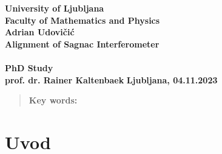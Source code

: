 \documentclass{article}
\begin{document}
\begin{titlepage}
	\begin{center}
		{\large \textbf{University of Ljubljana}} \\[0.1cm]
		{\large \textbf{Faculty of Mathematics and Physics}}
		\\[0.5cm]
		\vspace{2cm}
		{\LARGE \textbf{Adrian Udovičić}}\\[2.5cm]
		{\Huge \textbf{Alignment of Sagnac Interferometer}}\\[0.5cm]
		{\Huge \textbf{ }}\\[2cm]
		{\LARGE\textbf{PhD Study}}\\[2.5cm]
		\vspace{1.5cm}
		\hfill \large\textbf{prof. dr. Rainer Kaltenbaek}
		\vfill
		\large\textbf{{Ljubljana, 04.11.2023}}
	\end{center}
\end{titlepage}

\newpage
{}
\tableofcontents
\newpage
{}
\begin{abstract}
	\textbf{Key words:}
\end{abstract}
\newpage
{}
\section{Uvod}

\newpage


\listoftables
\listoffigures
\end{document}
